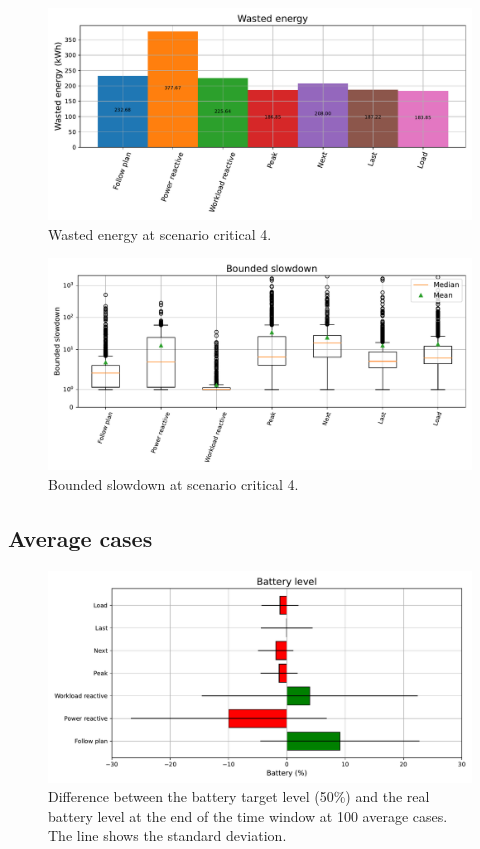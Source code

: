 \begin{figure}[!htb]
    \centering
    \includegraphics[scale=0.55]{Images/Compensations/energy_critical_4.pdf}
    \caption{Wasted energy at scenario critical 4.}
    \label{fig:energy_critical_4}
\end{figure}

\begin{figure}[!htb]
    \centering
    \includegraphics[scale=0.55]{Images/Compensations/slowdown_critical_4.pdf}
    \caption{Bounded slowdown at scenario critical 4.}
    \label{fig:slowdown_critical_4}
\end{figure}

\clearpage

\subsection{Average cases}

\begin{figure}[!htb]
    \centering
    \includegraphics[scale=0.55]{Images/Compensations/battery_diff.pdf}
    \caption{Difference between the battery target level (50\%) and the real battery level at the end of the time window at 100 average cases. The line shows the standard deviation.}
    \label{fig:SoC_diff}
\end{figure}


